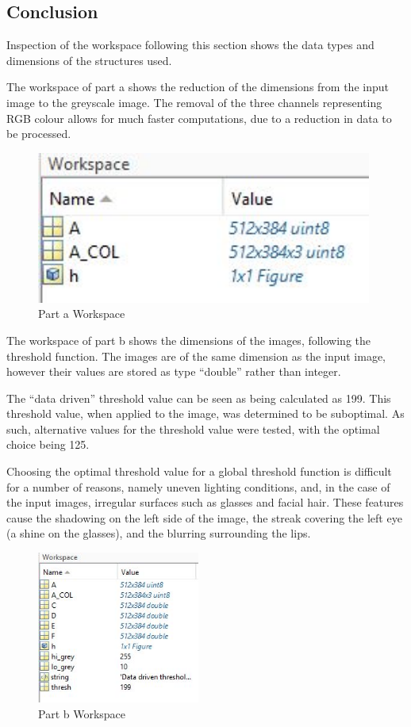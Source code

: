 \documentclass[a4paper]{article}
\begin{document}
	\subsection{Conclusion}
	Inspection of the workspace following this section shows the data types
	and dimensions of the structures used.
	\par The workspace of part a shows the reduction of the dimensions from
	the input image to the greyscale image. The removal of the three
	channels representing RGB colour allows for much faster computations,
	due to a reduction in data to be processed.
	\begin{figure}[H]
		\centering
		\includegraphics[height=5cm]{Results/Q1/a/Workspace.jpg}%
		\caption{Part a Workspace}
		\label{fig:}
	\end{figure}
	\par The workspace of part b shows the dimensions of the images,
	following the threshold function. The images are of the same dimension
	as the input image, however their values are stored as type ``double''
	rather than integer.
	\par The ``data driven'' threshold value can be seen as being calculated
	as 199. This threshold value, when applied to the image, was determined
	to be suboptimal. As such, alternative values for the threshold value
	were tested, with the optimal choice being 125.
	\par Choosing the optimal threshold value for a global threshold
	function is difficult for a number of reasons, namely uneven lighting
	conditions, and, in the case of the input images, irregular surfaces
	such as glasses and facial hair. These features cause the shadowing on
	the left side of the image, the streak covering the left eye (a shine on
	the glasses), and the blurring surrounding the lips.
	\begin{figure}[H]
		\centering
		\includegraphics[height=5cm]{Results/Q1/b/Workspace.jpg}%
		\caption{Part b Workspace}
		\label{fig:}
	\end{figure}
\end{document}
